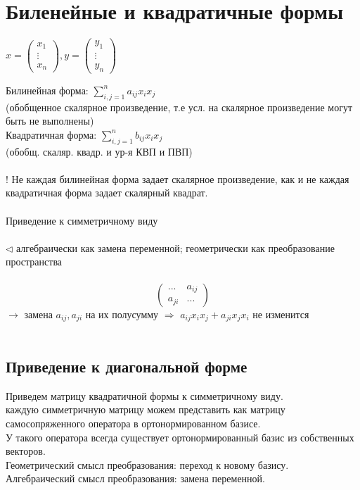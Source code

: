 \documentclass[12pt]{article}
\begin{document}
\section{Биленейные и квадратичные формы}

$x =
    \begin{pmatrix}
        x_1    \\
        \vdots \\
        x_n
    \end{pmatrix},
    y =
    \begin{pmatrix}
        y_1    \\
        \vdots \\
        y_n
    \end{pmatrix}$

Билинейная форма: \(\sum\limits_{i,j=1}^n a_{ij}x_ix_j\)\\
(обобщенное скалярное произведение, т.е усл. на скалярное произведение могут быть не выполнены)\\
Квадратичная форма: \(\sum\limits_{i,j=1}^n b_{ij}x_ix_j\)\\
(обобщ. скаляр. квадр. и ур-я КВП и ПВП)\\\\
! Не каждая билинейная форма задает скалярное произведение, как и не каждая квадратичная форма задает скалярный квадрат. \\\\
Приведение к симметричному виду\\\\
\(\triangleleft\) алгебраически как замена переменной; геометрически как преобразование пространства\\\\
\[
    \begin{pmatrix}
        ...    & a_{ij} \\
        a_{ji} & ...
    \end{pmatrix}
\]
$\rightarrow$ замена $a_{ij}, a_{ji}$ на их полусумму $\Rightarrow$
$a_{ij}x_ix_j + a_{ji}x_jx_i$ не изменится\\\\
\subsection{Приведение к диагональной форме}
Приведем матрицу квадратичной формы к симметричному виду.\\
каждую симметричную матрицу можем представить как матрицу самосопряженного оператора в ортонормированном базисе.\\
У такого оператора всегда существует ортонормированный базис из собственных векторов.\\
Геометрический смысл преобразования: переход к новому базису.\\
Алгебраический смысл преобразования: замена переменной.\\
\end{document}
